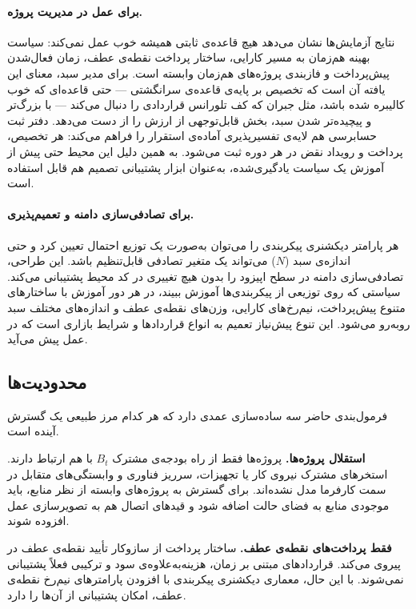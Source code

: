 \paragraph{برای عمل در مدیریت پروژه.}
نتایج آزمایش‌ها نشان می‌دهد هیچ قاعده‌ی ثابتی همیشه خوب عمل
نمی‌کند: سیاست بهینه هم‌زمان به مسیر کارایی، ساختار پرداخت نقطه‌ی
عطف، زمان فعال‌شدن پیش‌پرداخت و فازبندی پروژه‌های هم‌زمان وابسته
است. برای مدیر سبد، معنای این یافته آن است که تخصیص بر پایه‌ی
قاعده‌ی سرانگشتی — حتی قاعده‌ای که خوب کالیبره شده باشد، مثل
جبران  که کف تلورانس قراردادی را دنبال می‌کند — با بزرگ‌تر
و پیچیده‌تر شدن سبد، بخش قابل‌توجهی از ارزش را از دست می‌دهد.
دفتر ثبت حسابرسی هم لایه‌ی تفسیرپذیری آماده‌ی استقرار را فراهم
می‌کند: هر تخصیص، پرداخت و رویداد نقض در هر دوره ثبت می‌شود. به
همین دلیل این محیط حتی پیش از آموزش یک سیاست یادگیری‌شده، به‌عنوان
ابزار پشتیبانی تصمیم هم قابل استفاده است.

\paragraph{برای تصادفی‌سازی دامنه و تعمیم‌پذیری.}
هر پارامتر دیکشنری پیکربندی را می‌توان به‌صورت یک توزیع احتمال
تعیین کرد و حتی اندازه‌ی سبد ($N$) می‌تواند یک متغیر تصادفی
قابل‌تنظیم باشد. این طراحی، تصادفی‌سازی دامنه در سطح اپیزود
\citep{Tobin2017} را بدون هیچ تغییری در کد محیط پشتیبانی می‌کند.
سیاستی که روی توزیعی از پیکربندی‌ها آموزش ببیند، در هر دور آموزش
با ساختارهای متنوع پیش‌پرداخت، نیم‌رخ‌های کارایی، وزن‌های نقطه‌ی
عطف و اندازه‌های مختلف سبد روبه‌رو می‌شود. این تنوع پیش‌نیاز تعمیم
به انواع قراردادها و شرایط بازاری است که در عمل پیش می‌آید.

\subsection{محدودیت‌ها}
\label{subsec:limitations}

فرمول‌بندی حاضر سه ساده‌سازی عمدی دارد که هر کدام مرز طبیعی یک
گسترش آینده است.

\textbf{استقلال پروژه‌ها.} پروژه‌ها فقط از راه بودجه‌ی مشترک
$B_t$ با هم ارتباط دارند. استخرهای مشترک نیروی کار یا تجهیزات،
سرریز فناوری و وابستگی‌های متقابل در سمت کارفرما مدل نشده‌اند.
برای گسترش به پروژه‌های وابسته از نظر منابع، باید موجودی منابع به
فضای حالت اضافه شود و قیدهای اتصال هم به تصویرسازی عمل افزوده
شوند.

\textbf{فقط پرداخت‌های نقطه‌ی عطف.} ساختار پرداخت از سازوکار تأیید
نقطه‌ی عطف در  پیروی می‌کند. قراردادهای مبتنی بر زمان،
هزینه‌به‌علاوه‌ی سود و ترکیبی فعلاً پشتیبانی نمی‌شوند. با این حال،
معماری دیکشنری پیکربندی با افزودن پارامترهای نیم‌رخ نقطه‌ی عطف،
امکان پشتیبانی از آن‌ها را دارد.

